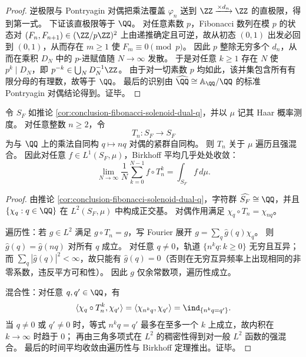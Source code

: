 \begin{proof}
逆极限与 Pontryagin 对偶把乘法覆盖 \(\varphi_n\) 送到 \(\ZZ\xrightarrow{\times d_n}\ZZ\) 的直极限，得到第一式。
下证该直极限等于 \(\QQ\)。
对任意素数 \(p\)，Fibonacci 数列在模 \(p\) 的状态对 \((F_n,F_{n+1})\in(\ZZ/p\ZZ)^2\) 上由递推确定且可逆，故从初态 \((0,1)\) 出发必回到 \((0,1)\)，从而存在 \(m\ge 1\) 使 \(F_m\equiv 0\pmod p\)。
因此 \(p\) 整除无穷多个 \(d_n\)，从而在乘积 \(D_N\) 中的 \(p\)-进赋值随 \(N\to\infty\) 发散。
于是对任意 \(k\ge 1\) 存在 \(N\) 使 \(p^k\mid D_N\)，即 \(p^{-k}\in \bigcup_N D_N^{-1}\ZZ\)。
由于对一切素数 \(p\) 均如此，该并集包含所有有限分母的有理数，故等于 \(\QQ\)。
最后的识别由 \(\widehat{\QQ}\cong \mathbb A_\QQ/\QQ\) 的标准 Pontryagin 对偶结论得到。证毕。
\end{proof}

\begin{theorem}\label{thm:conclusion-qhat-multiplication-ergodic-mixing}
令 \(S_F\) 如推论 \ref{cor:conclusion-fibonacci-solenoid-dual-q}，并以 \(\mu\) 记其 Haar 概率测度。
对任意整数 \(n\ge 2\)，令
\[
T_n:S_F\to S_F
\]
为与 \(\QQ\) 上的乘法自同构 \(q\mapsto nq\) 对偶的紧群自同构。
则 \(T_n\) 关于 \(\mu\) 遍历且强混合。
因此对任意 \(f\in L^1(S_F,\mu)\)，Birkhoff 平均几乎处处收敛：
\[
\lim_{N\to\infty}\frac1N\sum_{k=0}^{N-1} f\circ T_n^k
=\int_{S_F} f\,d\mu.
\]
\end{theorem}

\begin{proof}
由推论 \ref{cor:conclusion-fibonacci-solenoid-dual-q}，字符群 \(\widehat{S_F}\cong\QQ\)，并且 \(\{\chi_q:q\in\QQ\}\) 在 \(L^2(S_F,\mu)\) 中构成正交基。
对偶作用满足 \(\chi_q\circ T_n=\chi_{nq}\)。
\par
遍历性：若 \(g\in L^2\) 满足 \(g\circ T_n=g\)，写 Fourier 展开 \(g=\sum_q \widehat g(q)\chi_q\)。
则 \(\widehat g(q)=\widehat g(nq)\) 对所有 \(q\) 成立。
对任意 \(q\neq 0\)，轨道 \(\{n^k q:k\ge 0\}\) 无穷且互异；
而 \(\sum_q|\widehat g(q)|^2<\infty\)，故只能有 \(\widehat g(q)=0\)（否则在无穷互异频率上出现相同的非零系数，违反平方可和性）。
因此 \(g\) 仅余常数项，遍历性成立。
\par
混合性：对任意 \(q,q'\in\QQ\)，有
\[
\langle \chi_q\circ T_n^k,\chi_{q'}\rangle
=\langle \chi_{n^k q},\chi_{q'}\rangle
=\ind_{\{n^k q=q'\}}.
\]
当 \(q\neq 0\) 或 \(q'\neq 0\) 时，等式 \(n^k q=q'\) 最多在至多一个 \(k\) 上成立，故内积在 \(k\to\infty\) 时趋于 \(0\)；
再由三角多项式在 \(L^2\) 的稠密性得到对一般 \(L^2\) 函数的强混合。
最后的时间平均收敛由遍历性与 Birkhoff 定理推出。证毕。
\end{proof}

